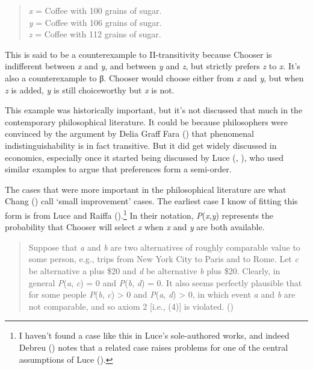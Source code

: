 \documentclass[
  11pt,
  letterpaper,
  DIV=11,
  numbers=noendperiod,
  twoside]{scrartcl}
\begin{document}
\begin{quote}
\emph{x} = Coffee with 100 grains of sugar.\\
\emph{y} = Coffee with 106 grains of sugar.\\
\emph{z} = Coffee with 112 grains of sugar.
\end{quote}

This is said to be a counterexample to II-transitivity because Chooser
is indifferent between \emph{x} and \emph{y}, and between \emph{y} and
\emph{z}, but strictly prefers \emph{z} to \emph{x}. It's also a
counterexample to β. Chooser would choose either from \emph{x} and
\emph{y}, but when \emph{z} is added, \emph{y} is still choiceworthy but
\emph{x} is not.

This example was historically important, but it's not discussed that
much in the contemporary philosophical literature. It could be because
philosophers were convinced by the argument by Delia Graff Fara
() that phenomenal indistinguishability is
in fact transitive. But it did get widely discussed in economics,
especially once it started being discussed by Luce
(, ), who used
similar examples to argue that preferences form a semi-order.

The cases that were more important in the philosophical literature are
what Chang () call `small improvement'
cases. The earliest case I know of fitting this form is from Luce and
Raiffa ().\footnote{I haven't found a
  case like this in Luce's sole-authored works, and indeed Debreu
  () notes that a related case raises
  problems for one of the central assumptions of Luce
  ().} In their notation,
\emph{P}(\emph{x},\emph{y}) represents the probability that Chooser will
select \emph{x} when \emph{x} and \emph{y} are both available.

\begin{quote}
Suppose that \emph{a} and \emph{b} are two alternatives of roughly
comparable value to some person, e.g., trips from New York City to Paris
and to Rome. Let \emph{c} be alternative a plus \$20 and \emph{d} be
alternative \emph{b} plus \$20. Clearly, in general \emph{P}(\emph{a},
\emph{c}) = 0 and \emph{P}(\emph{b}, \emph{d}) = 0. It also seems
perfectly plausible that for some people \emph{P}(\emph{b}, \emph{c})
\textgreater{} 0 and \emph{P}(\emph{a}, \emph{d}) \textgreater{} 0, in
which event \emph{a} and \emph{b} are not comparable, and so axiom 2
{[}i.e., (4){]} is violated. ()
\end{quote}
\end{document}
